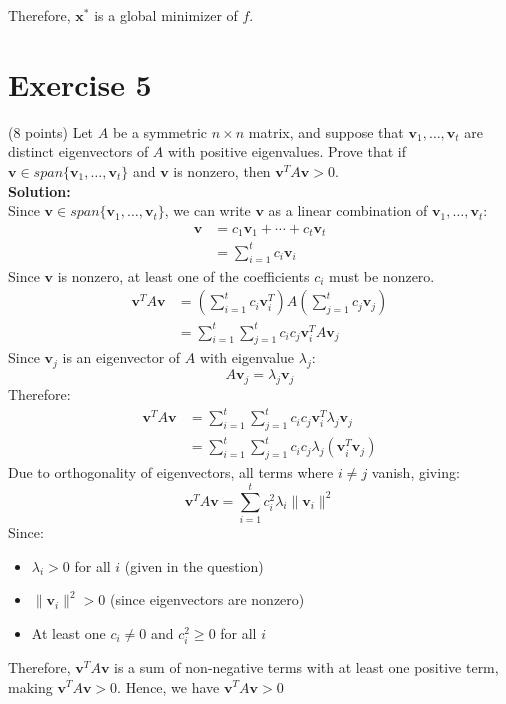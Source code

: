 \documentclass{article}
\begin{document}
Therefore, $\mathbf{x}^*$ is a global minimizer of $f$. \\

\newpage

\section*{Exercise 5}
(8 points) Let $A$ be a symmetric $n \times n$ matrix, and suppose that $\mathbf{v}_1,\ldots,\mathbf{v}_t$ are distinct eigenvectors of $A$ with positive eigenvalues. Prove that if $\mathbf{v} \in span\{\mathbf{v}_1,\ldots,\mathbf{v}_t\}$ and $\mathbf{v}$ is nonzero, then $\mathbf{v}^T A\mathbf{v} > 0$. \\

\textbf{Solution:} \\

Since $\mathbf{v} \in span\{\mathbf{v}_1,\ldots,\mathbf{v}_t\}$, we can write $\mathbf{v}$ as a linear combination of $\mathbf{v}_1,\ldots,\mathbf{v}_t$:
\begin{align*}
    \mathbf{v} &= c_1\mathbf{v}_1 + \cdots + c_t\mathbf{v}_t \\
    &= \sum_{i=1}^t c_i\mathbf{v}_i
\end{align*}
Since $\mathbf{v}$ is nonzero, at least one of the coefficients $c_i$ must be nonzero.
\begin{align*}
\mathbf{v}^T A\mathbf{v} &= \left(\sum_{i=1}^t c_i\mathbf{v}_i^T\right)A\left(\sum_{j=1}^t c_j\mathbf{v}_j\right) \\
&= \sum_{i=1}^t \sum_{j=1}^t c_ic_j\mathbf{v}_i^T A\mathbf{v}_j
\end{align*}
Since $\mathbf{v}_j$ is an eigenvector of $A$ with eigenvalue $\lambda_j$:
\[A\mathbf{v}_j = \lambda_j\mathbf{v}_j\]
Therefore:
\begin{align*}
\mathbf{v}^T A\mathbf{v} &= \sum_{i=1}^t \sum_{j=1}^t c_ic_j\mathbf{v}_i^T \lambda_j\mathbf{v}_j \\
&= \sum_{i=1}^t \sum_{j=1}^t c_ic_j\lambda_j(\mathbf{v}_i^T\mathbf{v}_j)
\end{align*}
Due to orthogonality of eigenvectors, all terms where $i \neq j$ vanish, giving:
    \[\mathbf{v}^T A\mathbf{v} = \sum_{i=1}^t c_i^2\lambda_i\|\mathbf{v}_i\|^2\]
Since:
\begin{itemize}
   \item $\lambda_i > 0$ for all $i$ (given in the question)
   \item $\|\mathbf{v}_i\|^2 > 0$ (since eigenvectors are nonzero)
   \item At least one $c_i \neq 0$ and $c_i^2 \geq 0$ for all $i$
\end{itemize}

Therefore, $\mathbf{v}^T A\mathbf{v}$ is a sum of non-negative terms with at least one positive term, making $\mathbf{v}^T A\mathbf{v} > 0$. Hence, we have $\mathbf{v}^T A\mathbf{v} > 0$
\end{document}
